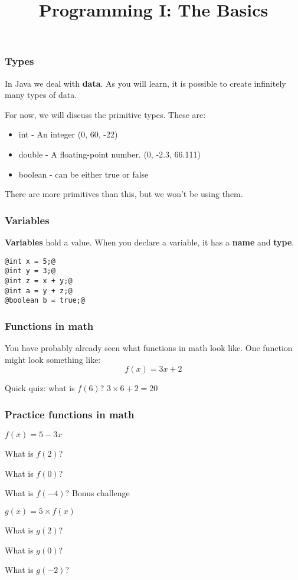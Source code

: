 \documentclass{beamer}
\title{Programming I: The Basics}
\date{}
\begin{document}
\frame{\titlepage}

\begin{frame}
\frametitle{Types}
In Java we deal with \textbf{data}. As you will learn, it is possible to create infinitely many types of data.
\pause

For now, we will discuss the primitive types. These are:
\pause
\begin{itemize}
\item int - An integer (0, 60, -22)
\pause
\item double - A floating-point number. (0, -2.3, 66.111)
\pause
\item boolean - can be either true or false
\end{itemize}
\pause

There are more primitives than this, but we won't be using them.
\end{frame}

\begin{frame}[fragile]
\frametitle{Variables}
\textbf{Variables} hold a value. When you declare a variable, it has a \textbf{name} and \textbf{type}.
\pause
{}
\begin{lstlisting}[style=base]
@int x = 5;@
@int y = 3;@
@int z = x + y;@
@int a = y + z;@
@boolean b = true;@
\end{lstlisting}

\end{frame}

\begin{frame}
\frametitle{Functions in math}
You have probably already seen what functions in math look like. One function might look something like:
$$f(x)=3x+2$$

\pause
Quick quiz: what is $f(6)$?
\pause
$3\times6 + 2 = 20$

\end{frame}

\begin{frame}
\frametitle{Practice functions in math}
$f(x)=5-3x$

What is $f(2)$?
\pause

What is $f(0)$?
\pause

What is $f(-4)$?
\pause
\newline
\newline
Bonus challenge

$g(x)=5 \times f(x)$

What is $g(2)$?
\pause

What is $g(0)$?
\pause

What is $g(-2)$?
\end{frame}
\end{document}
